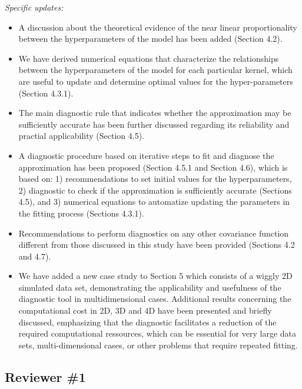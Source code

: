 \documentclass[11pt]{report}
\begin{document}
\noindent \textit{Specific updates:}

\begin{itemize}

\item A discussion about the theoretical evidence of the near linear proportionality between the hyperparameters of the model has been added (Section 4.2). 

\item We have derived numerical equations that characterize the relationships between the hyperparameters of the model for each particular kernel, which are useful to update and determine optimal values for the hyper-parameters (Section 4.3.1). 

\item The main diagnostic rule that indicates whether the approximation may be sufficiently accurate has been further discussed regarding its reliability and practial applicability (Section 4.5).

\item A diagnostic procedure based on iterative steps to fit and diagnose the approximation has been proposed (Section 4.5.1 and Section 4.6), which is based on: 1) recommendations to set initial values for the hyperparameters, 2) diagnostic to check if the approximation is sufficiently accurate (Sections 4.5), and 3) numerical equations to automatize updating the parameters in the fitting process (Sections 4.3.1).

\item Recommendations to perform diagnostics on any other covariance function different from those discussed in this study have been provided (Sections 4.2 and 4.7).

\item We have added a new case study to Section 5 which consists of a wiggly 2D simulated data set, demonstrating the applicability and usefulness of the diagnostic tool in multidimensional cases. Additional results concerning the computational cost in 2D, 3D and 4D have been presented and briefly discussed, emphasizing that the diagnostic facilitates a reduction of the required computational ressources, which can be essential for very large data sets, multi-dimensional cases, or other problems that require repeated fitting.

\end{itemize}

\noindent \hdashrule{12.5cm}{0.2pt}{2mm 1pt}

\subsection*{Reviewer \#1}
\end{document}
